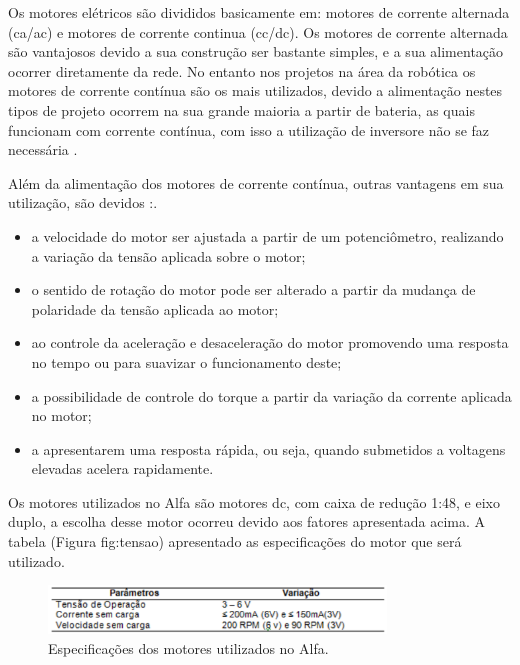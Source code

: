 Os motores elétricos são divididos basicamente em: motores de corrente alternada (ca/ac) e motores de corrente continua (cc/dc). Os motores
de corrente alternada são vantajosos devido a sua construção ser bastante simples, e a sua alimentação ocorrer diretamente da rede. No
entanto nos projetos na área da robótica os motores de corrente contínua são os mais utilizados, devido a alimentação nestes tipos de
projeto ocorrem na sua grande maioria a partir de bateria, as quais funcionam com corrente contínua, com isso a utilização de inversore
não se faz necessária \cite{braga:2006}.


Além da alimentação dos motores de corrente contínua, outras vantagens em sua utilização, são devidos \cite{braga:2006}:.
\begin{itemize}
	\item a velocidade do motor ser ajustada a partir de um potenciômetro, realizando a variação da tensão aplicada sobre o motor;
	\item o sentido de rotação do motor pode ser alterado a partir da mudança de polaridade da tensão aplicada ao motor;
	\item ao controle da aceleração e desaceleração do motor promovendo uma resposta no tempo ou para suavizar o funcionamento deste;
	\item a possibilidade de controle do torque a partir da variação da corrente aplicada no motor;
	\item a apresentarem uma resposta rápida, ou seja, quando submetidos a voltagens elevadas acelera rapidamente.
\end{itemize}

Os motores utilizados no Alfa são motores dc, com caixa de redução 1:48, e eixo duplo, a escolha desse motor ocorreu devido aos
fatores apresentada acima. A tabela (Figura fig:tensao) apresentado as especificações do motor que será utilizado.

\begin{figure}[H]
    \centering
    \includegraphics[width=0.8\textwidth]{figuras/tensao.eps}
    \caption{Especificações dos motores utilizados no Alfa.}
    \label{fig:tensao}
\end{figure}

